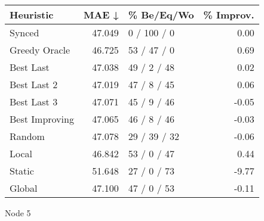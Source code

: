 \begin{tabular}{lrlr}
\toprule
\textbf{Heuristic} & \textbf{MAE ↓} & \textbf{\% Be/Eq/Wo} & \textbf{\% Improv.} \\
\midrule
            Synced &         47.049 &          0 / 100 / 0 &                0.00 \\
     Greedy Oracle &         46.725 &          53 / 47 / 0 &                0.69 \\
         Best Last &         47.038 &          49 / 2 / 48 &                0.02 \\
       Best Last 2 &         47.019 &          47 / 8 / 45 &                0.06 \\
       Best Last 3 &         47.071 &          45 / 9 / 46 &               -0.05 \\
    Best Improving &         47.065 &          46 / 8 / 46 &               -0.03 \\
            Random &         47.078 &         29 / 39 / 32 &               -0.06 \\
             Local &         46.842 &          53 / 0 / 47 &                0.44 \\
            Static &         51.648 &          27 / 0 / 73 &               -9.77 \\
            Global &         47.100 &          47 / 0 / 53 &               -0.11 \\
\bottomrule
\end{tabular}
\caption{Node 5}
\label{tab:iid_lr01_le2_bs2_5}
